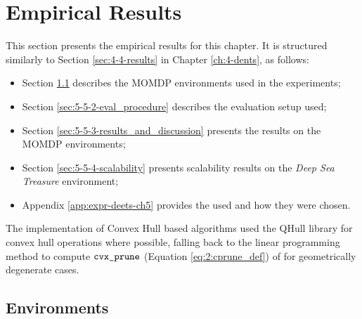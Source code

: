     














\section{Empirical Results}
\label{sec:5-5-results}

    This section presents the empirical results for this chapter. It is structured similarly to Section \ref{sec:4-4-results} in Chapter \ref{ch:4-dents}, as follows:
    \begin{itemize}
        \item Section \ref{sec:5-5-1-envs} describes the MOMDP environments used in the experiments;
        \item Section \ref{sec:5-5-2-eval_procedure} describes the evaluation setup used;
        \item Section \ref{sec:5-5-3-results_and_discussion} presents the results on the MOMDP environments;
        \item Section \ref{sec:5-5-4-scalability} presents scalability results on the \textit{Deep Sea Treasure} environment;
        \item Appendix \ref{app:expr-deets-ch5} provides the  used and how they were chosen.
    \end{itemize}

    The implementation of Convex Hull based algorithms used the QHull library \cite{qhull} for convex hull operations where possible, falling back to the linear programming method to compute ${\textnormal{\texttt{cvx\_prune}}}$ (Equation \ref{eq:2:cprune_def}) of \citet{cccs} for geometrically degenerate cases.




\subsection{Environments}
\label{sec:5-5-1-envs}


